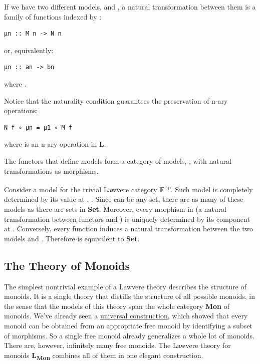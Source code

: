 If we have two different models,  and , a natural
transformation between them is a family of functions indexed by
:

\begin{verbatim}
μn :: M n -> N n
\end{verbatim}

or, equivalently:

\begin{verbatim}
μn :: an -> bn
\end{verbatim}

where .

Notice that the naturality condition guarantees the preservation of
n-ary operations:

\begin{verbatim}
N f ∘ μn = μ1 ∘ M f
\end{verbatim}

where  is an n-ary operation in
\textbf{L}.

The functors that define models form a category of models,
, with natural transformations as morphisms.

Consider a model for the trivial Lawvere category
\textbf{F}\textsuperscript{op}. Such model is completely determined by
its value at , . Since  can be any
set, there are as many of these models as there are sets in
\textbf{Set}. Moreover, every morphism in  (a
natural transformation between functors  and ) is
uniquely determined by its component at . Conversely, every
function  induces a natural
transformation between the two models  and .
Therefore  is equivalent to \textbf{Set}.

\subsection{The Theory of Monoids}\label{the-theory-of-monoids}

The simplest nontrivial example of a Lawvere theory describes the
structure of monoids. It is a single theory that distills the structure
of all possible monoids, in the sense that the models of this theory
span the whole category \textbf{Mon} of monoids. We've already seen a
\href{https://bartoszmilewski.com/2015/07/21/free-monoids/}{universal
construction}, which showed that every monoid can be obtained from an
appropriate free monoid by identifying a subset of morphisms. So a
single free monoid already generalizes a whole lot of monoids. There
are, however, infinitely many free monoids. The Lawvere theory for
monoids \textbf{L\textsubscript{Mon}} combines all of them in one
elegant construction.

